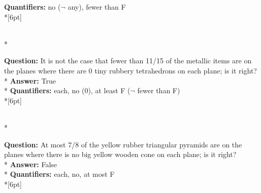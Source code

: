 \begin{figure*}
\begin{minipage}{0.48\textwidth}
\begin{minipage}[t][2.2cm][t]{1\textwidth}
      \textbf{Quantifiers:} no ($\neg$ any), fewer than F  \\*[6pt]
    \end{minipage}\\*
    \begin{minipage}[t][2.2cm][t]{1\textwidth}
      \footnotesize
      \textbf{Question:} It is not the case that fewer than 11/15 of the metallic items are on the planes where there are 0 tiny rubbery tetrahedrons on each plane; is it right? \\*
      \textbf{Answer:} True \\*
      \textbf{Quantifiers:} each, no (0), at least F ($\neg$ fewer than F) \\*[6pt]
    \end{minipage}\\*
    \begin{minipage}[t][2.2cm][t]{1\textwidth}
      \footnotesize
      \textbf{Question:} At most 7/8 of the yellow rubber triangular pyramids are on the planes where there is no big yellow wooden cone on each plane; is it right? \\*
      \textbf{Answer:} False \\*
      \textbf{Quantifiers:} each, no, at most F \\*[6pt]
    \end{minipage}
  \end{minipage}
  \vspace{0.2cm}
  

\end{figure*}
